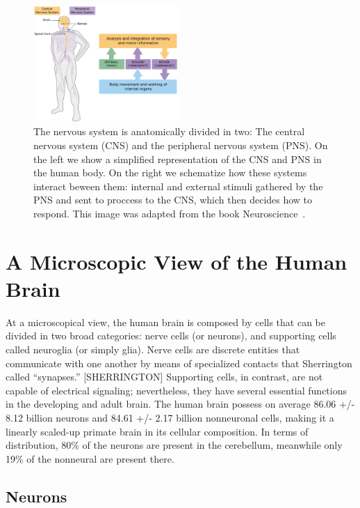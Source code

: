 \begin{figure}[h!]                                                                                                                    
    \includegraphics[width=0.49\textwidth]{2.neuroanatomy/img/pns_and_cns.png}
    \caption{The nervous system is anatomically divided in two: The central
             nervous system (CNS) and the peripheral nervous system (PNS).
             On the left we show a simplified representation of the CNS and
             PNS in the human body. On the right we schematize how these systems
             interact beween them: internal and external stimuli gathered by
             the PNS and sent to proccess to the CNS, which then decides how to
             respond. This image was adapted from the book Neuroscience~\cite{Johns}.}
    \label{fig:cns_and_pns}
\end{figure}  


\section{A Microscopic View of the Human Brain}
\cite{Waehnert2014}

At a microscopical view, the human brain is composed by cells that can be divided in two broad categories: nerve cells (or neurons), and supporting cells called neuroglia (or simply glia).
Nerve cells are discrete entities that communicate with one another by means of specialized contacts that Sherrington called “synapses.” [SHERRINGTON]
Supporting cells, in contrast, are not capable of electrical signaling; nevertheless, they have several essential functions in the developing and adult brain.
The human brain possess on average 86.06 +/- 8.12 billion neurons and 84.61 +/- 2.17 billion nonneuronal cells, making it a linearly scaled-up primate brain in its cellular composition.
In terms of distribution, 80\% of the neurons are present in the cerebellum, meanwhile only 19\% of the nonneural are present there.

\subsection{Neurons}

